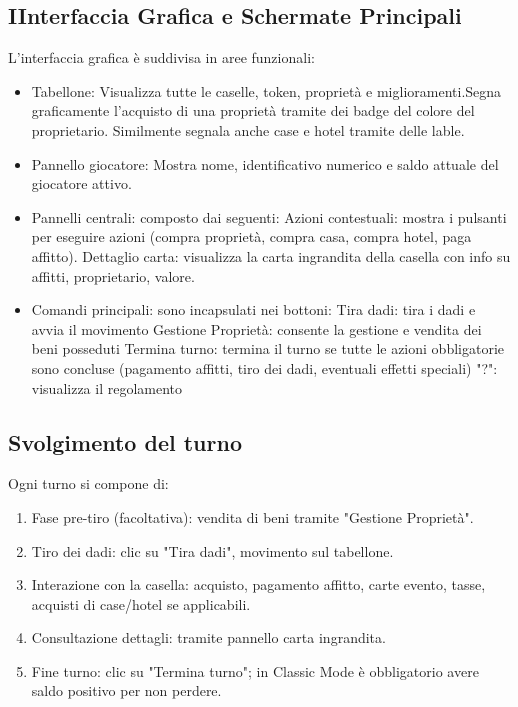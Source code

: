 \subsection{IInterfaccia Grafica e Schermate Principali}
L’interfaccia grafica è suddivisa in aree funzionali:\newline
\begin{itemize}
    \item Tabellone:\newline
    Visualizza tutte le caselle, token, proprietà e miglioramenti.\newline Segna graficamente l'acquisto di una proprietà tramite dei badge del colore del proprietario. Similmente segnala anche case e hotel tramite delle lable.
    \item Pannello giocatore:\newline
    Mostra nome, identificativo numerico e saldo attuale del giocatore attivo.
    \item Pannelli centrali:\newline
    composto dai seguenti:\newline
    Azioni contestuali: mostra i pulsanti per eseguire azioni (compra proprietà, compra casa, compra hotel, paga affitto).\newline
    Dettaglio carta: visualizza la carta ingrandita della casella con info su affitti, proprietario, valore.
    \item Comandi principali:\newline
    sono incapsulati nei bottoni:\newline
    Tira dadi: tira i dadi e avvia il movimento\newline
    Gestione Proprietà: consente la gestione e vendita dei beni posseduti\newline
    Termina turno: termina il turno se tutte le azioni obbligatorie sono concluse (pagamento affitti, tiro dei dadi, eventuali effetti speciali)\newline
    "?": visualizza il regolamento
\end{itemize}
\subsection{Svolgimento del turno}
Ogni turno si compone di:
\begin{enumerate}
    \item Fase pre-tiro (facoltativa): vendita di beni tramite "Gestione Proprietà".
    \item Tiro dei dadi: clic su "Tira dadi", movimento sul tabellone.
    \item Interazione con la casella: acquisto, pagamento affitto, carte evento, tasse, acquisti di case/hotel se applicabili.
    \item Consultazione dettagli: tramite pannello carta ingrandita.
    \item Fine turno: clic su "Termina turno"; in Classic Mode è obbligatorio avere saldo positivo per non perdere.
\end{enumerate}

